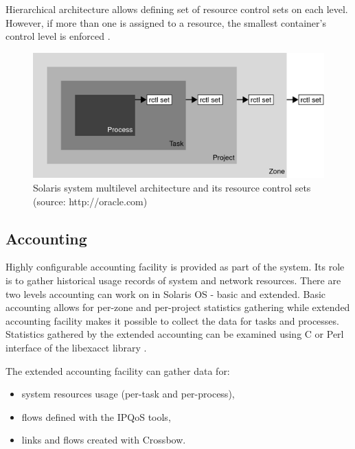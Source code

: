 \documentclass[11pt]{book}
\begin{document}
      Hierarchical architecture allows defining set of resource control sets on each level. However, if more than one is
      assigned to a resource, the smallest container's control level is enforced \cite{oracle_admin_guide}. 

      \begin{figure}[H]
        \begin{center}
          \includegraphics[width=.7\textwidth]{img/rctrl.png}
        \end{center}
        
        \caption{Solaris system multilevel architecture and its resource control sets (source: http://oracle.com)} %
		  \end{figure}


      \subsection{Accounting}
      \label{sub:sol:acct}

        Highly configurable accounting facility is provided as part of the system. Its role is to gather historical
        usage records of system and network resources. There are two levels accounting can work on in Solaris
        OS - basic and extended. Basic accounting allows for per-zone and per-project statistics gathering while
        extended accounting facility makes it possible to collect the data for tasks and processes. Statistics gathered
        by the extended accounting can be examined using C or Perl interface of the libexacct library \cite{sag}.

        The extended accounting facility can gather data for:

        \begin{itemize}
          \item system resources usage (per-task and per-process),
          \item flows defined with the IPQoS tools,
          \item links and flows created with Crossbow.
        \end{itemize}
\end{document}
